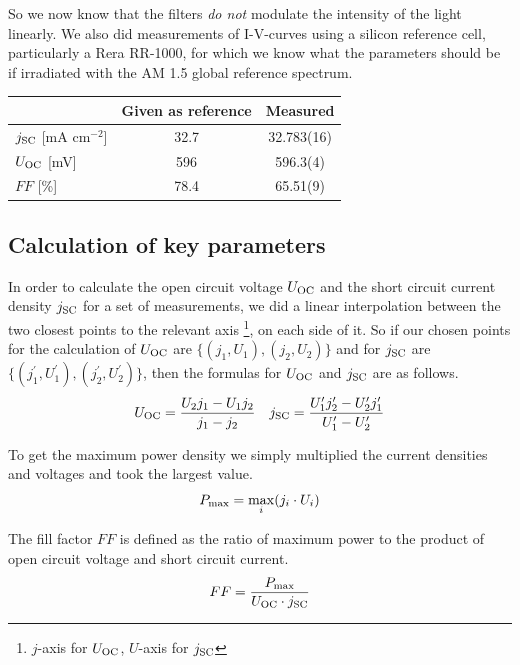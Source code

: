 \documentclass[a4paper,10pt,twocolumn]{article}
\begin{document}
\begin{extract*}
So we now know that the filters \emph{do not} modulate the intensity of the light linearly.\mypar
We also did measurements of I-V-curves using a silicon reference cell, particularly a Rera RR-1000, for which we know what the parameters should be\cite{reracat} if irradiated with the AM 1.5 global reference spectrum.
\begin{table}[h]
	\centering
	\begin{tabular}{@{}lcc@{}}\toprule
		& Given as reference\cite{reracat} & Measured\\\midrule
		$j_{\text{SC}}$ [mA cm$^{-2}$] & 32.7 & 32.783(16) \\
		$U_{\text{OC}}$ [mV]& 596 & 596.3(4) \\
		$FF$ [\%] & 78.4 & 65.51(9) \\\bottomrule
	\end{tabular}
\end{table}



\subsection{Calculation of key parameters}


In order to calculate the open circuit voltage $U_{\text{OC}}$ and the short circuit current density $j_{\text{SC}}$ for a set of measurements, we did a linear interpolation between the two closest points to the relevant axis \footnote{$j$-axis for $U_{\text{OC}}$, $U$-axis for $j_{\text{SC}}$}, on each side of it. So if our chosen points for the calculation of $U_{\text{OC}}$ are $\{(j_1,U_1),(j_2,U_2)\}$ and for $j_{\text{SC}}$ are $\{(j_1^\prime,U_1^\prime),(j_2^\prime,U_2^\prime)\}$, then the formulas for $U_{\text{OC}}$ and $j_{\text{SC}}$ are as follows.
\begin{align}
	U_{\text{OC}} = \frac{U_2 j_1 - U_1 j_2}{j_1-j_2}\quad j_{\text{SC}} = \frac{U_1^\prime j_2^\prime - U_2^\prime j_1^\prime}{U_1^\prime-U_2^\prime}
\end{align}

To get the maximum power density we simply multiplied the current densities and voltages and took the largest value.
\begin{align}
	P_{\text{max}} = \max_{i} (j_i\cdot U_i)
\end{align}

The fill factor $FF$ is defined as the ratio of maximum power to the product of open circuit voltage and short circuit current.
\begin{align}
	FF = \frac{P_{\text{max}}}{U_{\text{OC}} \cdot j_{\text{SC}}}
\end{align}


\end{extract*}
\end{document}
